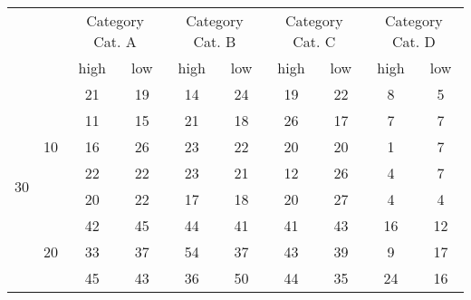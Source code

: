 \begin{table}[h]
\begin{tabular}{cc|c|c|c|c|c|c|c|c|}
\cline{3-10}
                                           &                     & \multicolumn{2}{c|}{Category Cat. A} & \multicolumn{2}{c|}{Category Cat. B} & \multicolumn{2}{c|}{Category Cat. C} & \multicolumn{2}{c|}{Category Cat. D} \\ \cline{3-10} 
                                           &                     & high            & low           & high            & low           & high            & low           & high            & low           \\ \hline
\multicolumn{1}{|c|}{\multirow{15}{*}{30}} & \multirow{5}{*}{10} & 21              & 19            & 14              & 24            & 19              & 22            & 8               & 5             \\ \cline{3-10} 
\multicolumn{1}{|c|}{}                     &                     & 11              & 15            & 21              & 18            & 26              & 17            & 7               & 7             \\ \cline{3-10} 
\multicolumn{1}{|c|}{}                     &                     & 16              & 26            & 23              & 22            & 20              & 20            & 1               & 7             \\ \cline{3-10} 
\multicolumn{1}{|c|}{}                     &                     & 22              & 22            & 23              & 21            & 12              & 26            & 4               & 7             \\ \cline{3-10} 
\multicolumn{1}{|c|}{}                     &                     & 20              & 22            & 17              & 18            & 20              & 27            & 4               & 4             \\ \cline{2-10} 
\multicolumn{1}{|c|}{}                     & \multirow{5}{*}{20} & 42              & 45            & 44              & 41            & 41              & 43            & 16              & 12            \\ \cline{3-10} 
\multicolumn{1}{|c|}{}                     &                     & 33              & 37            & 54              & 37            & 43              & 39            & 9               & 17            \\ \cline{3-10} 
\multicolumn{1}{|c|}{}                     &                     & 45              & 43            & 36              & 50            & 44              & 35            & 24              & 16            \\ \cline{3-10} 

\end{tabular}
\end{table}
